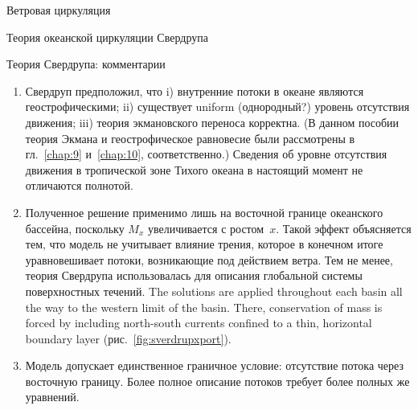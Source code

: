 \begin{chapter}{Ветровая циркуляция}
\begin{section}{Теория океанской циркуляции Свердрупа}
\begin{paragraph}{Теория Свердрупа: комментарии}
\begin{enumerate}
\item 
Свердруп предположил, что 
   i) внутренние потоки в океане являются геострофическими;
  ii) существует uniform (однородный?) уровень отсутствия движения;
 iii) теория экмановского переноса корректна.
(В данном пособии теория Экмана и геострофическое равновесие были
рассмотрены в гл.~\ref{chap:9} и~\ref{chap:10}, соответственно.) 
Сведения об уровне отсутствия движения в тропической зоне Тихого океана 
в настоящий момент не отличаются полнотой.
%

\item 
Полученное решение применимо лишь на восточной границе океанского бассейна,
поскольку $M_x$ увеличивается с ростом~$x$. Такой эффект объясняется тем,
что модель не учитывает влияние трения, которое в конечном итоге 
уравновешивает потоки, возникающие под действием ветра. 
Тем не менее, теория Свердрупа использовалась для описания глобальной 
системы поверхностных течений. 
The solutions are applied throughout each basin all the way
to the western limit of the basin.  There, conservation of mass is
forced by including north-south currents confined to a thin,
horizontal boundary layer (рис.~\ref{fig:sverdrupxport}).
%

\item 
Модель допускает единственное граничное условие: отсутствие потока через
восточную границу. Более полное описание потоков требует более полных же
уравнений.
%


\end{enumerate}
\end{paragraph}
\end{section}
\end{chapter}
